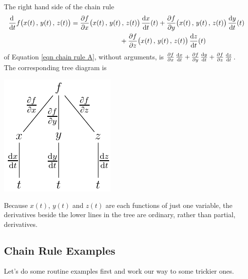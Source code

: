 \begin{eg}\label{eg decTree}
The right hand side of the chain rule
\begin{align*}
\diff{}{t}f\big(x(t)\,,\,y(t)\,,\,z(t)\big) &= \pdiff{f}{x}\big(x(t)\,,\,y(t)\,,\,z(t)\big)\, \diff{x}{t}(t)
           +\pdiff{f}{y}\big(x(t)\,,\,y(t)\,,\,z(t)\big)\, \diff{y}{t}(t) \\
     &\hskip1in   +\pdiff{f}{z}\big(x(t)\,,\,y(t)\,,\,z(t)\big)\, \diff{z}{t}(t)
\end{align*}
of Equation \eqref{eqn chain rule A}, without arguments, is
     $\pdiff{f}{x}\, \diff{x}{t}
     +\pdiff{f}{y}\, \diff{y}{t}
     +\pdiff{f}{z}\, \diff{z}{t}$. 
The corresponding tree diagram is
\begin{efig}
\begin{center}
   \includegraphics{decTreeTT.pdf}
\end{center}
\end{efig}
Because $x(t)$, $y(t)$ and $z(t)$ are each functions of just one variable, the
derivatives beside the lower lines in the tree are ordinary, rather 
than partial, derivatives. 
\end{eg}

\subsection{Chain Rule Examples}
\label{subsec chain rule examples}

Let's do some routine examples first and work our way to some trickier
ones.


